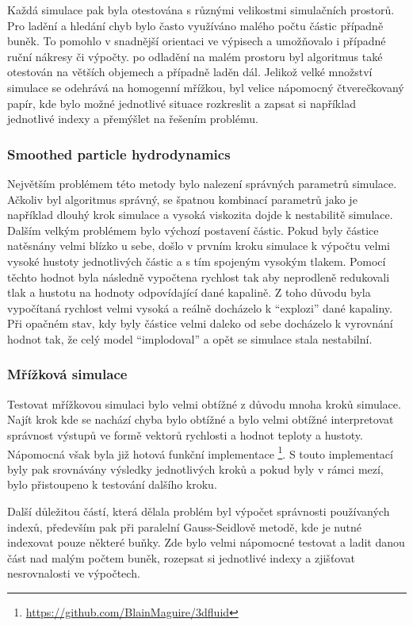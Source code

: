 Každá simulace pak byla otestována s různými velikostmi simulačních prostorů. Pro ladění a hledání chyb bylo často využíváno malého počtu částic případně buněk. To pomohlo v snadnější orientaci ve výpisech a umožňovalo i případné ruční nákresy či výpočty. po odladění na malém prostoru byl algoritmus také otestován na větších objemech a případně laděn dál. Jelikož velké množství simulace se odehrává na homogenní mřížkou, byl velice nápomocný čtverečkovaný papír, kde bylo možné jednotlivé situace rozkreslit a zapsat si například jednotlivé indexy a přemýšlet na řešením problému.

\subsubsection{Smoothed particle hydrodynamics}
Největším problémem této metody bylo nalezení správných parametrů simulace. Ačkoliv byl algoritmus správný, se špatnou kombinací parametrů jako je například dlouhý krok simulace a vysoká viskozita dojde k nestabilitě simulace. Dalším velkým problémem bylo výchozí postavení částic. Pokud byly částice natěsnány velmi blízko u sebe, došlo v prvním kroku simulace k výpočtu velmi vysoké hustoty jednotlivých částic a s tím spojeným vysokým tlakem. Pomocí těchto hodnot byla následně vypočtena rychlost tak aby neprodleně redukovali tlak a hustotu na hodnoty odpovídající dané kapalině. Z toho důvodu byla vypočítaná rychlost velmi vysoká a reálně docházelo k \enquote{explozi} dané kapaliny. Při opačném stav, kdy byly částice velmi daleko od sebe docházelo k vyrovnání hodnot tak, že celý model \enquote{implodoval} a opět se simulace stala nestabilní.

\subsubsection{Mřížková simulace}
Testovat mřížkovou simulaci bylo velmi obtížné z důvodu mnoha kroků simulace. Najít krok kde se nachází chyba bylo obtížné a bylo velmi obtížné interpretovat správnost výstupů ve formě vektorů rychlosti a hodnot teploty a hustoty. Nápomocná však byla již hotová funkční implementace \footnote{\url{https://github.com/BlainMaguire/3dfluid}}. S touto implementací byly pak srovnávány výsledky jednotlivých kroků a pokud byly v rámci mezí, bylo přistoupeno k testování dalšího kroku.

Další důležitou částí, která dělala problém byl výpočet správnosti používaných indexů, především pak při paralelní Gauss-Seidlově metodě, kde je nutné indexovat pouze některé buňky. Zde bylo velmi nápomocné testovat a ladit danou část nad malým počtem buněk, rozepsat si jednotlivé indexy a zjišťovat nesrovnalosti ve výpočtech.


